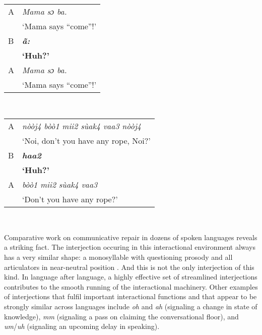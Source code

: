 \documentclass[output=paper]{langsci/langscibook}
\begin{document}
\ea
\ea
{}\\
  \begin{tabular}{ll}
    A   & \textit{Mama sɔ ba.}\\
	&‘Mama says “come”!’ \\
    B 	& \textbf{\textit{ã:}}\\
	&\textbf{‘Huh?’}\\
    A   &\textit{Mama sɔ ba.}\\
	&‘Mama says “come”!’  
    \end{tabular}
  \ex
  \\
  \begin{tabular}{ll}
    A 	& \textit{nòòj4 bòò1 mii2 sùak4 vaa3 nòòj4}\\
	& ‘Noi, don’t you have any rope, Noi?’\\
    B 	& \textbf{\textit{haa2}}\\
	&  \textbf{‘Huh?’}\\
      A & \textit{bòò1 mii2 sùak4 vaa3}\\
	&  ‘Don’t you have any rope?’\\
    \end{tabular}\\
\z
\z


\largerpage
 
Comparative work on communicative repair in dozens of spoken languages reveals a striking fact. The interjection occuring in this interactional environment always has a very similar shape: a monosyllable with questioning prosody and all articulators in near-neutral position \citep{Dingemanse2013}. And this is not the only interjection of this kind. In language after language, a highly effective set of streamlined interjections contributes to the smooth running of the interactional machinery. Other examples of interjections that fulfil important interactional functions and that appear to be strongly similar across languages include \textit{oh} and \textit{ah }(signaling a change in state of knowledge), \textit{mm }(signaling a pass on claiming the conversational floor), and \textit{um}/\textit{uh} (signaling an upcoming delay in speaking). 
 
\end{document}
